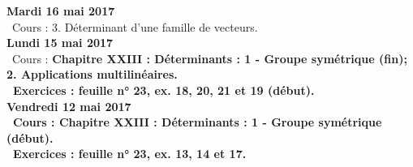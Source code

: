 \documentclass[12pt,a4paper]{article}
\begin{document}
% 
% 
% 
% 
% 

\noindent\textbf{Mardi 16 mai 2017}\\
\bu\ Cours : 3. Déterminant d’une famille de vecteurs.\vspace{.4cm}\\

\noindent\textbf{\bf Lundi 15 mai 2017} \\
\bu\ Cours : \bf Chapitre XXIII \rm : Déterminants : 1 - Groupe symétrique (fin); 2. Applications multilinéaires.\\
\bu\ Exercices : feuille n° 23, ex. 18, 20, 21 et 19 (début).\vspace{.4cm}\\

\noindent\textbf{Vendredi 12 mai 2017}\\
\bu\ Cours : \bf Chapitre XXIII \rm : Déterminants : 1 - Groupe symétrique (début).\\
\bu\ Exercices : feuille n° 23, ex. 13, 14 et 17.\vspace{.4cm}\\
\end{document}
